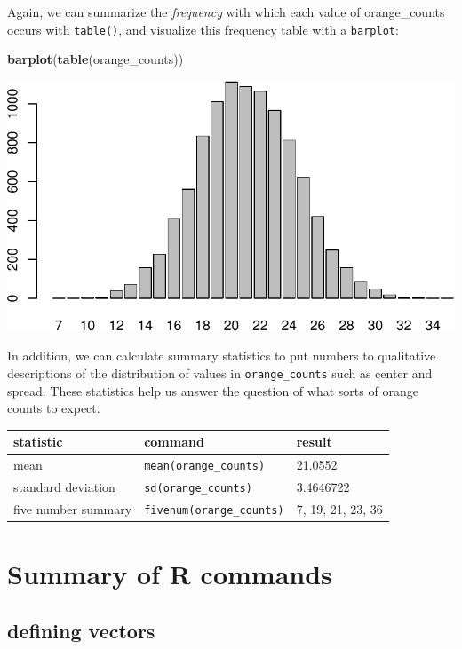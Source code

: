 \documentclass[
]{book}
\newenvironment{Shaded}{\begin{snugshade}}{\end{snugshade}}
\newcommand{\FunctionTok}[1]{\textcolor[rgb]{0.13,0.29,0.53}{\textbf{#1}}}
\newcommand{\NormalTok}[1]{#1}
\theoremstyle{definition}
\theoremstyle{definition}
\theoremstyle{definition}
\theoremstyle{definition}
\theoremstyle{remark}
\begin{document}
Again, we can summarize the \emph{frequency} with which each value of orange\_counts occurs with \texttt{table()}, and visualize this frequency table with a \texttt{barplot}:

\begin{Shaded}
\begin{Highlighting}[]
\FunctionTok{barplot}\NormalTok{(}\FunctionTok{table}\NormalTok{(orange\_counts))}
\end{Highlighting}
\end{Shaded}

\includegraphics{math340-notes_files/figure-latex/unnamed-chunk-92-1.pdf}

In addition, we can calculate summary statistics to put numbers to qualitative descriptions of the distribution of values in \texttt{orange\_counts} such as center and spread. These statistics help us answer the question of what sorts of orange counts to expect.

\begin{longtable}[]{@{}lll@{}}
\toprule\noalign{}
statistic & command & result \\
\midrule\noalign{}
\endhead
\bottomrule\noalign{}
\endlastfoot
mean & \texttt{mean(orange\_counts)} & 21.0552 \\
standard deviation & \texttt{sd(orange\_counts)} & 3.4646722 \\
five number summary & \texttt{fivenum(orange\_counts)} & 7, 19, 21, 23, 36 \\
\end{longtable}

\section{Summary of R commands}\label{sampling-commands}

\subsection{defining vectors}\label{defining-vectors}
\end{document}
